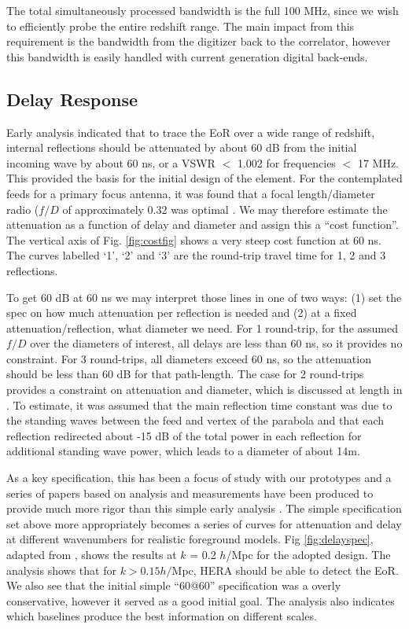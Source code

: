 \documentclass[preprint,11pt]{aastex}
\begin{document}
The total simultaneously processed bandwidth is the full 100 MHz, since we wish to efficiently probe the entire redshift range.  The main impact from this requirement is the bandwidth from the digitizer back to the correlator, however this bandwidth is easily handled with current generation digital back-ends.

\subsection{Delay Response}
\label{sec:delayspec}
Early analysis \citep{elementmemo} indicated that to trace the EoR over a wide range of redshift, internal reflections should be attenuated by about 60 dB from the initial incoming wave by about 60 ns, or a VSWR $<$ 1.002 for frequencies $<$ 17 MHz.  This provided the basis for the initial design of the element.    For the contemplated feeds for a primary focus antenna, it was found that a focal length/diameter radio ($f/D$ of approximately 0.32 was optimal \citep{elementmemo}.  We may therefore estimate the attenuation as a function of delay and diameter and assign this a ``cost function''.  The vertical axis of Fig. \ref{fig:costfig} shows a very steep cost function at 60 ns.  The curves labelled `1', `2' and `3' are the round-trip travel time for 1, 2 and 3 reflections.  

To get 60 dB at 60 ns we may interpret those lines in one of two ways:  (1) set the spec on how much attenuation per reflection is needed and (2) at a fixed attenuation/reflection, what diameter we need.  For 1 round-trip, for the assumed $f/D$ over the diameters of interest, all delays are less than 60 ns, so it provides no constraint.  For
3 round-trips, all diameters exceed 60 ns, so the attenuation should be less than 60 dB for that path-length.  The case for 2 round-trips provides a constraint on attenuation and diameter, which is discussed at length in \cite{elementmemo}.
To estimate, it was assumed that the main reflection time constant was due to the standing waves between the feed and vertex of the parabola and that each reflection redirected about -15 dB of the total power in each reflection for additional standing wave power, which leads to a diameter of about 14m.

As a key specification, this has been a focus of study with our prototypes and a series of papers based on analysis and measurements have been produced to provide much more rigor than this simple early analysis \citep{ewall-wice_et_al2016-EoXLimits,neben_et_al2016,thyagarajan_et_al2016,patra_et_al0216}.  The simple specification set above more appropriately becomes a series of curves for attenuation and delay at different wavenumbers for realistic foreground models.  Fig \ref{fig:delayspec}, adapted from \cite{thyagarajan_et_al2016}, shows the results at $k$ = 0.2 $h$/Mpc for the adopted design.  The analysis shows that for $k>0.15 h/$Mpc, HERA should be able to detect the EoR.  We also see that the initial simple ``60@60'' specification was a overly conservative, however it served as a good initial goal.  The analysis also indicates which baselines produce the best information on different scales.
\end{document}
